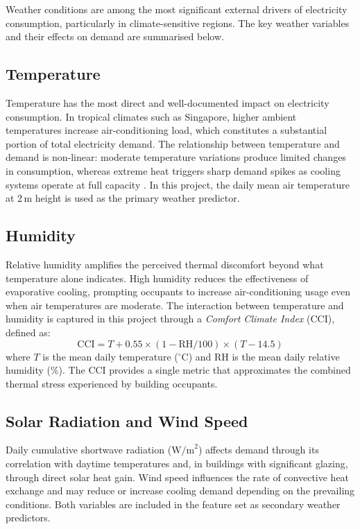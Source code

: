 Weather conditions are among the most significant external drivers of electricity consumption, particularly in climate-sensitive regions. The key weather variables and their effects on demand are summarised below.

\subsection{Temperature}

Temperature has the most direct and well-documented impact on electricity consumption. In tropical climates such as Singapore, higher ambient temperatures increase air-conditioning load, which constitutes a substantial portion of total electricity demand. The relationship between temperature and demand is non-linear: moderate temperature variations produce limited changes in consumption, whereas extreme heat triggers sharp demand spikes as cooling systems operate at full capacity \parencite{zhao2012review}. In this project, the daily mean air temperature at 2\,m height is used as the primary weather predictor.

\subsection{Humidity}

Relative humidity amplifies the perceived thermal discomfort beyond what temperature alone indicates. High humidity reduces the effectiveness of evaporative cooling, prompting occupants to increase air-conditioning usage even when air temperatures are moderate. The interaction between temperature and humidity is captured in this project through a \emph{Comfort Climate Index} (CCI), defined as:
\begin{equation}\label{eq:cci}
    \text{CCI} = T + 0.55 \times (1 - \text{RH}/100) \times (T - 14.5)
\end{equation}
where $T$ is the mean daily temperature ($^\circ$C) and RH is the mean daily relative humidity (\%). The CCI provides a single metric that approximates the combined thermal stress experienced by building occupants.

\subsection{Solar Radiation and Wind Speed}

Daily cumulative shortwave radiation ($\text{W/m}^2$) affects demand through its correlation with daytime temperatures and, in buildings with significant glazing, through direct solar heat gain. Wind speed influences the rate of convective heat exchange and may reduce or increase cooling demand depending on the prevailing conditions. Both variables are included in the feature set as secondary weather predictors.

